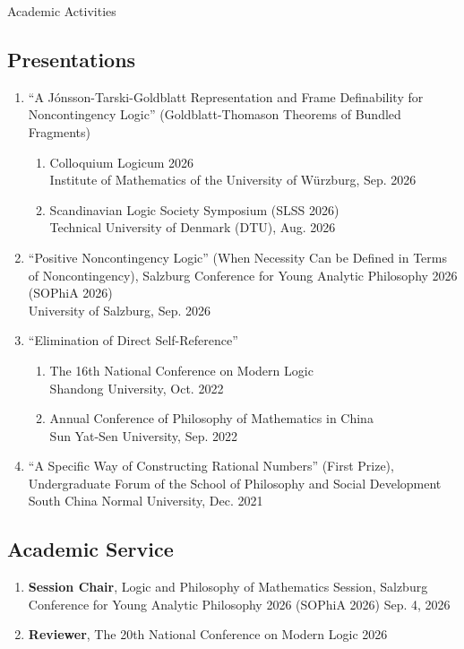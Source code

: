 \documentclass{resume}
\begin{document}
\begin{rSection}{Academic Activities}
\subsection*{Presentations}
\begin{enumerate}
\item “A Jónsson-Tarski-Goldblatt Representation and Frame Definability for Noncontingency Logic” (Goldblatt-Thomason Theorems of Bundled Fragments)
\begin{enumerate}
    \item Colloquium Logicum 2026
\\ \null\hfill Institute of Mathematics of the University of Würzburg, Sep. 2026
    \item Scandinavian Logic Society Symposium (SLSS 2026)
\\ \null\hfill Technical University of Denmark (DTU), Aug. 2026
\end{enumerate}
\item “Positive Noncontingency Logic” (When Necessity Can be Defined in Terms of Noncontingency), Salzburg Conference for Young Analytic Philosophy 2026 (SOPhiA 2026)
\\ \null\hfill University of Salzburg, Sep. 2026
\item “Elimination of Direct Self-Reference”
\begin{enumerate}
    \item The 16th National Conference on Modern Logic
\\ \null\hfill Shandong University, Oct. 2022
    \item Annual Conference of Philosophy of Mathematics in China
\\ \null\hfill Sun Yat-Sen University, Sep. 2022
\end{enumerate}
\item “A Specific Way of Constructing Rational Numbers” (First Prize), Undergraduate Forum of the School of Philosophy and Social Development
\\ \null\hfill South China Normal University, Dec. 2021
\end{enumerate}

\subsection*{Academic Service}
\begin{enumerate}
\item \textbf{Session Chair}, Logic and Philosophy of Mathematics Session, Salzburg Conference for Young Analytic Philosophy 2026 (SOPhiA 2026) \hfill Sep. 4, 2026
\item \textbf{Reviewer}, The 20th National Conference on Modern Logic \hfill 2026
\end{enumerate}


\end{rSection}
\end{document}
